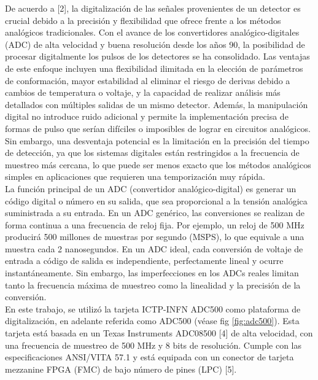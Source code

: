 \documentclass[]{book}
\begin{document}
\noindent De acuerdo a [2], la digitalización de las señales provenientes de un detector es crucial debido a la precisión y flexibilidad que ofrece frente a los métodos analógicos tradicionales. Con el avance de los convertidores analógico-digitales (ADC) de alta velocidad y buena resolución desde los años 90, la posibilidad de procesar digitalmente los pulsos de los detectores se ha consolidado. Las ventajas de este enfoque incluyen una flexibilidad ilimitada en la elección de parámetros de conformación, mayor estabilidad al eliminar el riesgo de derivas debido a cambios de temperatura o voltaje, y la capacidad de realizar análisis más detallados con múltiples salidas de un mismo detector. Además, la manipulación digital no introduce ruido adicional y permite la implementación precisa de formas de pulso que serían difíciles o imposibles de lograr en circuitos analógicos. Sin embargo, una desventaja potencial es la limitación en la precisión del tiempo de detección, ya que los sistemas digitales están restringidos a la frecuencia de muestreo más cercana, lo que puede ser menos exacto que los métodos analógicos simples en aplicaciones que requieren una temporización muy rápida.\\

\noindent La función principal de un ADC (convertidor analógico-digital) es generar un código digital o número en su salida, que sea proporcional a la tensión analógica suministrada a su entrada. En un ADC genérico, las conversiones se realizan de forma continua a una frecuencia de reloj fija. Por ejemplo, un reloj de 500 MHz producirá 500 millones de muestras por segundo (MSPS), lo que equivale a una muestra cada 2 nanosegundos. En un ADC ideal, cada conversión de voltaje de entrada a código de salida es independiente, perfectamente lineal y ocurre instantáneamente. Sin embargo, las imperfecciones en los ADCs reales limitan tanto la frecuencia máxima de muestreo como la linealidad y la precisión de la conversión. \\

\noindent En este trabajo, se utilizó la tarjeta ICTP-INFN ADC500 como plataforma de digitalización, en adelante referida como ADC500 (véase fig \ref*{fig:adc500}). Esta tarjeta está basada en un Texas Instruments ADC08500 [4] de alta velocidad, con una frecuencia de muestreo de 500 MHz y 8 bits de resolución. Cumple con las especificaciones ANSI/VITA 57.1 y está equipada con un conector de tarjeta mezzanine FPGA (FMC) de bajo número de pines (LPC) [5].\\
\end{document}
